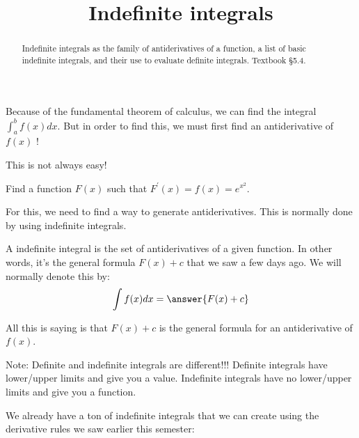 \documentclass{ximera}
\title{Indefinite integrals}
\begin{document}
\begin{abstract}
Indefinite integrals as the family of antiderivatives of a function, a list of basic indefinite integrals, and their use to evaluate definite integrals. Textbook §5.4.
\end{abstract}
\maketitle

Because of the fundamental theorem of calculus, we can find the integral $\int_{a}^{b} f(x) d x$. But in order to find this, we must first find an antiderivative of $f(x)$ !

This is not always easy!

\begin{example}\label{example:13-4}
Find a function $F(x)$ such that $F^{\prime}(x)=f(x)=e^{x^{2}}$.
\begin{freeResponse}\end{freeResponse}
\end{example}

For this, we need to find a way to generate antiderivatives. This is normally done by using indefinite integrals.

A indefinite integral is the set of  antiderivatives of a given function. In other words, it's the general formula $F(x)+c$ that we saw a few days ago. We will normally denote this by:
\[
\int f(x) d x=\answer{F(x)+c}
\]

All this is saying is that $F(x)+c$ is the general formula for an antiderivative of $f(x)$.

\begin{warning}
Note: Definite and indefinite integrals are different!!! Definite integrals have lower/upper limits and give you a value. Indefinite integrals have no lower/upper limits and give you a function.
\end{warning}

We already have a ton of indefinite integrals that we can create using the derivative rules we saw earlier this semester:
\end{document}
